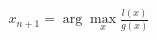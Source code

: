 \documentclass[preview]{standalone}
\begin{document}
\begin{align*}
x_{n+1} = \arg\max_x \frac{l(x)}{g(x)}
\end{align*}
\end{document}
